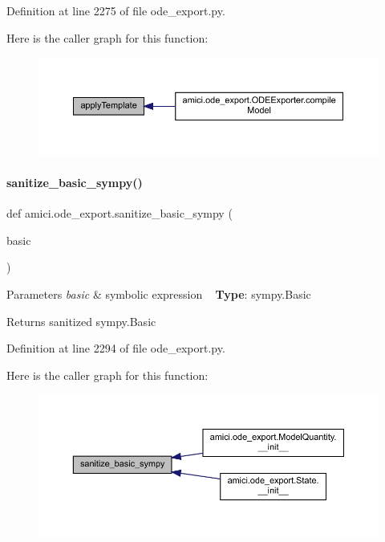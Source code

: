 Definition at line 2275 of file ode\+\_\+export.\+py.

Here is the caller graph for this function\+:
\nopagebreak
\begin{figure}[H]
\begin{center}
\leavevmode
\includegraphics[width=350pt]{namespaceamici_1_1ode__export_af4b013340d08cdef3247601d2bf0b62f_icgraph}
\end{center}
\end{figure}
\mbox{\label{namespaceamici_1_1ode__export_af0bfa7839b41792994b1add20b86cf8e}} 
\paragraph{\texorpdfstring{sanitize\+\_\+basic\+\_\+sympy()}{sanitize\_basic\_sympy()}}
{\footnotesize\ttfamily def amici.\+ode\+\_\+export.\+sanitize\+\_\+basic\+\_\+sympy (\begin{DoxyParamCaption}\item[{}]{basic }\end{DoxyParamCaption})}


\begin{DoxyParams}{Parameters}
{\em basic} & symbolic expression ~\newline
{\bfseries Type}\+: sympy.\+Basic\\
\hline
\end{DoxyParams}
\begin{DoxyReturn}{Returns}
sanitized sympy.\+Basic 
\end{DoxyReturn}


Definition at line 2294 of file ode\+\_\+export.\+py.

Here is the caller graph for this function\+:
\nopagebreak
\begin{figure}[H]
\begin{center}
\leavevmode
\includegraphics[width=350pt]{namespaceamici_1_1ode__export_af0bfa7839b41792994b1add20b86cf8e_icgraph}
\end{center}
\end{figure}


